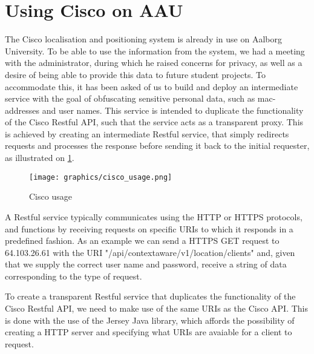\section{Using Cisco on AAU}
The Cisco localisation and positioning system is already in use on Aalborg University. To be able to use the information from the system, we had a meeting with the administrator, during which he raised concerns for privacy, as well as a desire of being able to provide this data to future student projects. To accommodate this, it has been asked of us to build and deploy an intermediate service with the goal of obfuscating sensitive personal data, such as mac-addresses and user names. This service is intended to duplicate the functionality of the Cisco Restful API, such that the service acts as a transparent proxy. This is achieved by creating an intermediate Restful service, that simply redirects requests and processes the response before sending it back to the initial requester, as illustrated on \cref{fig:cisco_usage}.

\begin{figure}[h]
	\begin{center}
	\texttt{[image: graphics/cisco\_usage.png]}
	\caption{Cisco usage}
	\label{fig:cisco_usage}
	\end{center} 
\end{figure}

A Restful service typically communicates using the HTTP or HTTPS protocols, and functions by receiving requests on specific URIs to which it responds in a predefined fashion. As an example we can send a HTTPS GET request to 64.103.26.61 with the URI "/api/contextaware/v1/location/clients" and, given that we supply the correct user name and password, receive a string of data corresponding to the type of request.  

To create a transparent Restful service that duplicates the functionality of the Cisco Restful API, we need to make use of the same URIs as the Cisco API. This is done with the use of the Jersey Java library, which affords the possibility of creating a HTTP server and specifying what URIs are avaiable for a client to request.

